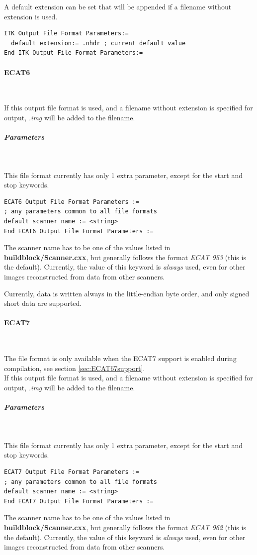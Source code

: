 \documentclass{article}
\newcommand{\subsubsubsection}[1]{\paragraph{#1}\mbox{} \\}
\newcommand{\subsubsubsubsection}[1]{\subparagraph{#1} \mbox{} \\}
\begin{document}
{{A default extension can be set that will be  appended if a filename without extension is used.

\begin{verbatim}
ITK Output File Format Parameters:=
  default extension:= .nhdr ; current default value
End ITK Output File Format Parameters:=
\end{verbatim}

{ \subsubsubsection{ECAT6}
}
If this output file format is used, and a filename without extension 
is specified for output, \textit{.img} will be added to the filename.

{ \subsubsubsubsection{Parameters}
}
This file format currently has only 1 extra parameter, except 
for the start and stop keywords.

\begin{verbatim}
ECAT6 Output File Format Parameters :=
; any parameters common to all file formats
default scanner name := <string>
End ECAT6 Output File Format Parameters :=
\end{verbatim}

The scanner name has to be one of the values listed in \textbf{buildblock/Scanner.cxx}, 
but generally follows the format \textit{ECAT 953} (this is the default). 
Currently, the value of this keyword is \textit{always} used, even 
for other images reconstructed from data from other scanners.

Currently, data is written always in the little-endian byte order, 
and only signed short data are supported.

{ \subsubsubsection{ECAT7}
}
The file format is only available when the ECAT7 support is enabled 
during compilation, see section \ref{sec:ECAT67support}.\\
If this output file format is used, and a filename without extension 
is specified for output, \textit{.img} will be added to the filename.

{ \subsubsubsubsection{Parameters}
}
This file format currently has only 1 extra parameter, except 
for the start and stop keywords.

\begin{verbatim}
ECAT7 Output File Format Parameters :=
; any parameters common to all file formats
default scanner name := <string>
End ECAT7 Output File Format Parameters :=
\end{verbatim}

The scanner name has to be one of the values listed in \textbf{buildblock/Scanner.cxx}, 
but generally follows the format \textit{ECAT 962} (this is the default). 
Currently, the value of this keyword is \textit{always} used, even 
for other images reconstructed from data from other scanners.


}}
\end{document}

